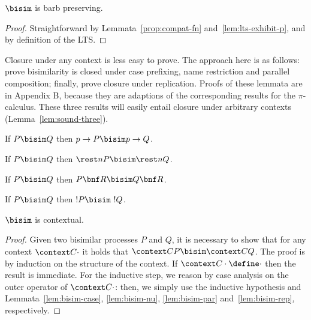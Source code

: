 \documentclass{LMCS}
\begin{document}
\begin{lem}
\label{lem:sound-one}
$\bisim$ is barb preserving.
\end{lem}
\begin{proof}
Straightforward by Lemmata~\ref{prop:compat-fn} and~\ref{lem:lts-exhibit-p}, and by definition of the LTS.
\end{proof}

Closure under any context is less easy to prove.
The approach here is as follows:
prove bisimilarity is closed under case prefixing,
name restriction and parallel composition; finally, prove closure under replication.
Proofs of these lemmata are in Appendix B, because they are adaptions
of the corresponding results for the $\pi$-calculus.
These three results will easily entail closure under arbitrary contexts (Lemma~\ref{lem:sound-three}).

\begin{lem}
\label{lem:bisim-case}
If $P\bisim Q$ then $p \to P \bisim p \to Q$.
\end{lem}

\begin{lem}
\label{lem:bisim-nu}
If $P\bisim Q$ then $\rest n P \bisim \rest n Q$.
\end{lem}

\begin{lem}
\label{lem:bisim-par}
If $P\bisim Q$ then $P\bnf R \bisim Q\bnf R$.
\end{lem}

\begin{lem}
\label{lem:bisim-rep}
If $P\bisim Q$ then $!P\bisim\,\, !Q$.
\end{lem}

\begin{lem}
\label{lem:sound-three}
$\bisim$ is contextual.
\end{lem}
\begin{proof}
Given two bisimilar processes $P$ and $Q$, it is necessary to show that for any context 
$\context C \cdot$ it holds that $\context C P \bisim \context C Q$.
The proof is by induction on the structure of the context.
If $\context C \cdot\define \cdot$ then the result is immediate.
For the inductive step, we reason by case analysis on the outer operator of $\context C \cdot$:
then, we simply use the inductive hypothesis and Lemmata~\ref{lem:bisim-case}, \ref{lem:bisim-nu},
\ref{lem:bisim-par} and~\ref{lem:bisim-rep}, respectively.
\end{proof}
\end{document}
